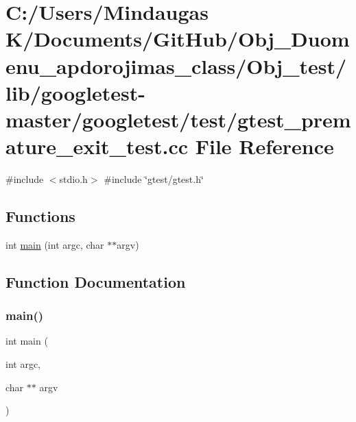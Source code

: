 \hypertarget{_obj__test_2lib_2googletest-master_2googletest_2test_2gtest__premature__exit__test_8cc}{}\section{C\+:/\+Users/\+Mindaugas K/\+Documents/\+Git\+Hub/\+Obj\+\_\+\+Duomenu\+\_\+apdorojimas\+\_\+class/\+Obj\+\_\+test/lib/googletest-\/master/googletest/test/gtest\+\_\+premature\+\_\+exit\+\_\+test.cc File Reference}
\label{_obj__test_2lib_2googletest-master_2googletest_2test_2gtest__premature__exit__test_8cc}
{\ttfamily \#include $<$stdio.\+h$>$}\newline
{\ttfamily \#include \char`\"{}gtest/gtest.\+h\char`\"{}}\newline
\subsection*{Functions}
\begin{DoxyCompactItemize}
\item 
int \mbox{\hyperlink{_obj__test_2lib_2googletest-master_2googletest_2test_2gtest__premature__exit__test_8cc_a3c04138a5bfe5d72780bb7e82a18e627}{main}} (int argc, char $\ast$$\ast$argv)
\end{DoxyCompactItemize}


\subsection{Function Documentation}
\mbox{\label{_obj__test_2lib_2googletest-master_2googletest_2test_2gtest__premature__exit__test_8cc_a3c04138a5bfe5d72780bb7e82a18e627}} 
\subsubsection{\texorpdfstring{main()}{main()}}
{\footnotesize\ttfamily int main (\begin{DoxyParamCaption}\item[{int}]{argc,  }\item[{char $\ast$$\ast$}]{argv }\end{DoxyParamCaption})}

